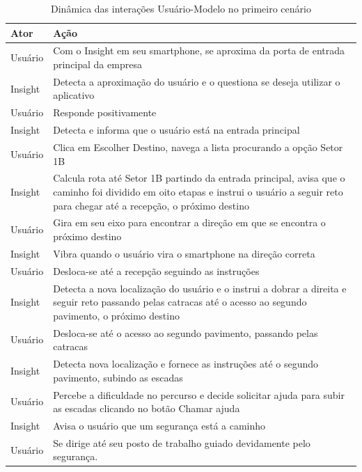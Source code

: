 \documentclass[twoside,english,brazilian]{UNISINOSartigo}
\begin{document}
\begin{table}
	\caption{Dinâmica das interações Usuário-Modelo no primeiro cenário}
	\label{tab:cenario1}
	\centering%
	\begin{minipage}{1\textwidth}
		\begin{adjustbox}{max width=\textwidth}
			\begin{tabular}{ p{} | p{14cm} }
				\hline
			 	\textbf{Ator} & \textbf{Ação}\\
				\hline
Usuário & Com o Insight em seu smartphone, se aproxima da porta de entrada principal da empresa \\
Insight & Detecta a aproximação do usuário e o questiona se deseja utilizar o aplicativo \\
Usuário & Responde positivamente \\
Insight & Detecta e informa que o usuário está na entrada principal \\
Usuário & Clica em Escolher Destino, navega a lista procurando a opção Setor 1B \\
Insight & Calcula rota até Setor 1B partindo da entrada principal, avisa que o caminho foi dividido em oito etapas e instrui o usuário a seguir reto para chegar até a recepção, o próximo destino \\
Usuário & Gira em seu eixo para encontrar a direção em que se encontra o próximo destino \\
Insight & Vibra quando o usuário vira o smartphone na direção correta \\
Usuário & Desloca-se até a recepção seguindo as instruções \\
Insight & Detecta a nova localização do usuário e o instrui a dobrar a direita e seguir reto passando pelas catracas até o acesso ao segundo pavimento, o próximo destino \\
Usuário & Desloca-se até o acesso ao segundo pavimento, passando pelas catracas \\
Insight & Detecta nova localização e fornece as instruções até o segundo pavimento, subindo as escadas \\
Usuário & Percebe a dificuldade no percurso e decide solicitar ajuda para subir as escadas clicando no botão Chamar ajuda \\
Insight & Avisa o usuário que um segurança está a caminho \\
Usuário & Se dirige até seu posto de trabalho guiado devidamente pelo segurança. \\
				\hline
			\end{tabular}
		\end{adjustbox}
	\end{minipage}
\end{table}
\end{document}
